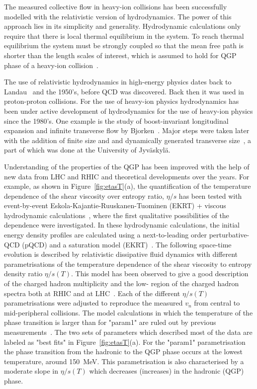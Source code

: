 The measured collective flow in heavy-ion collisions has been successfully modelled with the relativistic version of hydrodynamics. The power of this approach lies in its simplicity and generality. Hydrodynamic calculations only require that there is local thermal equilibrium in the system. To reach thermal equilibrium the system must be strongly coupled so that the mean free path is shorter than the length scales of interest, which is assumed to hold for QGP phase of a heavy-ion collision~\cite{Romatschke:2009im}.

The use of relativistic hydrodynamics in high-energy physics dates back to Landau~\cite{Landau:1953gs} and the 1950's, before QCD was discovered. Back then it was used in proton-proton collisions. For the use of heavy-ion physics hydrodynamics has been under active development of hydrodynamics for the use of heavy-ion physics since the 1980's. One example is the study of boost-invariant longitudinal expansion and infinite transverse flow by Bjorken~\cite{PhysRevD.27.140}. Major steps were taken later with the addition of finite size and and dynamically generated transverse size~\cite{Baym:1984sr, PhysRevD.34.794}, a part of which was done at the University of Jyväskylä. %

Understanding of the properties of the QGP has been improved with the help of new data from LHC and RHIC and theoretical developments over the years.
For example, as shown in Figure~\ref{fig:etasT}(a), the quantification of the temperature dependence of the shear viscosity over entropy ratio, $\eta/s$ has been tested with event-by-event Eskola-Kajantie-Ruuskanen-Tuominen (EKRT) + viscous hydrodynamic calculations~\cite{Niemi:2015qia}, where the first qualitative possibilities of the dependence were investigated.
In these hydrodynamic calculations, the initial energy density profiles are calculated using a next-to-leading order perturbative-QCD (pQCD) and a saturation model (EKRT)~\cite{Paatelainen:2012at,Paatelainen:2013eea}. The following space-time evolution is described by relativistic dissipative fluid dynamics with different parametrisations of the temperature dependence of the shear viscosity to entropy density ratio $\eta/s(T)$. 
This model has been observed to give a good description of the charged hadron multiplicity and the low-\pt{} region of the charged hadron spectra both at RHIC and at LHC~\cite{Niemi:2015qia}. Each of the different $\eta/s(T)$ parametrisations were adjusted to reproduce the measured $v_n$ from central to mid-peripheral collisions.
The model calculations in which the temperature of the phase transition is larger than for "param1" are ruled out by previous measurements~\cite{ALICE:2016kpq}.
The two sets of parameters which described most of the data are labeled as "best fits" in Figure~\ref{fig:etasT}(a).
For the "param1" parametrisation the phase transition from the hadronic to the QGP phase occurs at the lowest temperature, around 150~MeV. This parametrisation is also characterised by a moderate slope in $\eta/s(T)$ which decreases (increases) in the hadronic (QGP) phase.

